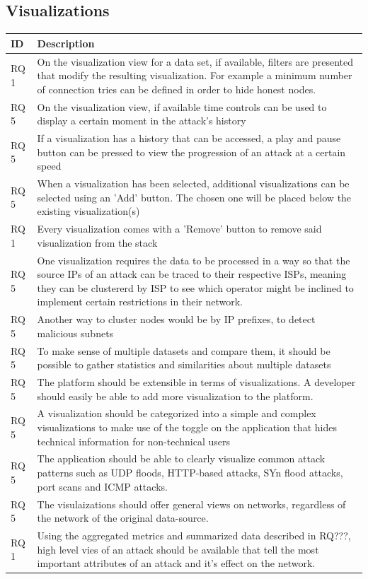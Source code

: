 \subsection{Visualizations}
\begin{table}[]
\centering
\begin{tabular}{|p{1.1cm}|p{12cm}|}
\hline
\textbf{ID} & \textbf{Description} \\ \hline
RQ 1 & On the visualization view for a data set, if available, filters are presented that modify the resulting visualization. For example a minimum number of connection tries can be defined in order to hide honest nodes.\\ \hline
RQ 5 & On the visualization view, if available time controls can be used to display a certain moment in the attack's history\\ \hline
RQ 5 & If a visualization has a history that can be accessed, a play and pause button can be pressed to view the progression of an attack at a certain speed\\ \hline
RQ 5 & When a visualization has been selected, additional visualizations can be selected using an 'Add' button. The chosen one will be placed below the existing visualization(s)\\ \hline
RQ 1 &  Every visualization comes with a 'Remove' button to remove said visualization from the stack\\ \hline
RQ 5 & One visualization requires the data to be processed in a way so that the source IPs of an attack can be traced to their respective ISPs, meaning they can be clustererd by ISP to see which operator might be inclined to implement certain restrictions in their network.\\ \hline
RQ 5 & Another way to cluster nodes would be by IP prefixes, to detect malicious subnets\\ \hline
RQ 5 & To make sense of multiple datasets and compare them, it should be possible to gather statistics and similarities about multiple datasets\\ \hline
RQ 5 & The platform should be extensible in terms of visualizations. A developer should easily be able to add more visualization to the platform.\\ \hline
RQ 5 & A visualization should be categorized into a simple and complex visualizations to make use of the toggle on the application that hides technical information for non-technical users\\ \hline
RQ 5 & The application should be able to clearly visualize common attack patterns such as UDP floods, HTTP-based attacks, SYn flood attacks, port scans and ICMP attacks.\\ \hline
RQ 5 & The visulaizations should offer general views on networks, regardless of the network of the original data-source.\\ \hline
RQ 1 &  Using the aggregated metrics and summarized data described in RQ???, high level vies of an attack should be available that tell the most important attributes of an attack and it's effect on the network.\\ \hline


\end{tabular}
\end{table}
